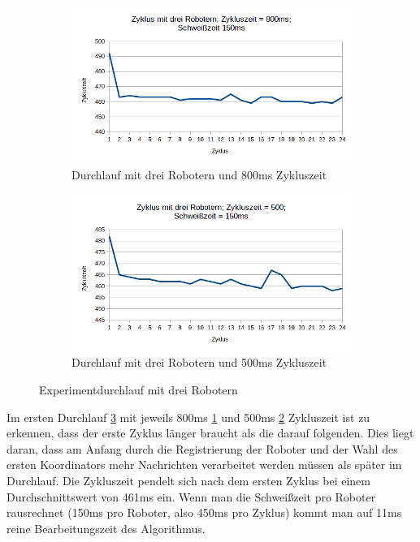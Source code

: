 \begin{figure}[h]
 \begin{subfigure}{.5\textwidth}
  \centering
  \includegraphics[width=\linewidth]{../evaluation_results/3_800.png}
  \caption{Durchlauf mit drei Robotern und \newline 800ms Zykluszeit}
  \label{fig:eval_3_800}
 \end{subfigure}
 \begin{subfigure}{.5\textwidth}
  \centering
  \includegraphics[width=\linewidth]{../evaluation_results/3_500.png}
  \caption{Durchlauf mit drei Robotern und \newline 500ms Zykluszeit}
  \label{fig:eval_3_500}
 \end{subfigure}
 \caption{Experimentdurchlauf mit drei Robotern}
 \label{fig:eval_3}
\end{figure}

Im ersten Durchlauf \ref{fig:eval_3} mit jeweils 800ms \ref{fig:eval_3_800} und 500ms \ref{fig:eval_3_500}
Zykluszeit ist zu erkennen, dass der erste Zyklus länger braucht als die darauf folgenden. Dies liegt daran,
dass am Anfang durch die Registrierung der Roboter und der Wahl des ersten Koordinators mehr Nachrichten
verarbeitet werden müssen als später im Durchlauf. Die Zykluszeit pendelt sich nach dem ersten Zyklus bei
einem Durchschnittswert von 461ms ein. Wenn man die Schweißzeit pro Roboter rausrechnet (150ms pro Roboter,
also 450ms pro Zyklus) kommt man auf 11ms reine Bearbeitungszeit des Algorithmus.

